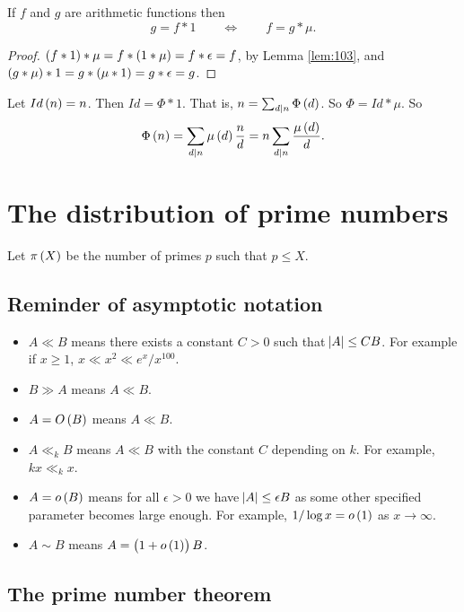 \begin{proposition}
If $ f $ and $ g $ are arithmetic functions then
$$ g = f * 1 \qquad \iff \qquad f = g * \mu. $$
\end{proposition}

\begin{proof}
$ \br{f * 1} * \mu = f * \br{1 * \mu} = f * \epsilon = f $, by Lemma \ref{lem:103}, and $ \br{g * \mu} * 1 = g * \br{\mu * 1} = g * \epsilon = g $.
\end{proof}

\begin{example*}
Let $ Id\br{n} = n $. Then $ Id = \Phi * 1 $. That is, $ n = \sum_{d \mid n} \Phi\br{d} $. So $ \Phi = Id * \mu $. So
$$ \Phi\br{n} = \sum_{d \mid n} \mu\br{d}\dfrac{n}{d} = n\sum_{d \mid n} \dfrac{\mu\br{d}}{d}. $$
\end{example*}

\pagebreak

\section{The distribution of prime numbers}

Let $ \pi\br{X} $ be the number of primes $ p $ such that $ p \le X $.

\subsection{Reminder of asymptotic notation}

\begin{itemize}
\item $ A \ll B $ means there exists a constant $ C > 0 $ such that $ \abs{A} \le CB $. For example if $ x \ge 1 $, $ x \ll x^2 \ll e^x / x^{100} $.
\item $ B \gg A $ means $ A \ll B $.
\item $ A = O\br{B} $ means $ A \ll B $.
\item $ A \ll_k B $ means $ A \ll B $ with the constant $ C $ depending on $ k $. For example, $ kx \ll_k x $.
\item $ A = o\br{B} $ means for all $ \epsilon > 0 $ we have $ \abs{A} \le \epsilon B $ as some other specified parameter becomes large enough. For example, $ 1 / \log x = o\br{1} $ as $ x \to \infty $.
\item $ A \sim B $ means $ A = \br{1 + o\br{1}}B $.
\end{itemize}

\subsection{The prime number theorem}

